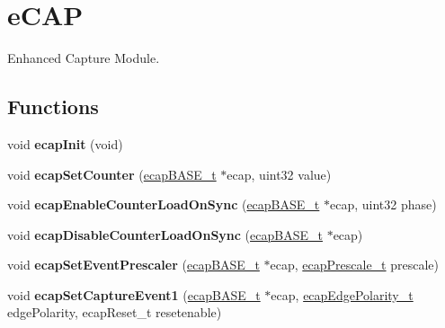 \hypertarget{group__eCAP}{}\section{e\+C\+AP}
\label{group__eCAP}


Enhanced Capture Module.  


\subsection*{Functions}
\begin{DoxyCompactItemize}
\item 
\mbox{\label{group__eCAP_ga516005c5605f393277666c3b9ba0c166}} 
void {\bfseries ecap\+Init} (void)
\item 
\mbox{\label{group__eCAP_ga364a27d4fcd363aa41d9c01cfa600138}} 
void {\bfseries ecap\+Set\+Counter} (\mbox{\hyperlink{reg__ecap_8h_a8ca3ed15315b354b71b837ed4b6685a9}{ecap\+B\+A\+S\+E\+\_\+t}} $\ast$ecap, uint32 value)
\item 
\mbox{\label{group__eCAP_ga7f98ac834b9764febaf55917242a9b90}} 
void {\bfseries ecap\+Enable\+Counter\+Load\+On\+Sync} (\mbox{\hyperlink{reg__ecap_8h_a8ca3ed15315b354b71b837ed4b6685a9}{ecap\+B\+A\+S\+E\+\_\+t}} $\ast$ecap, uint32 phase)
\item 
\mbox{\label{group__eCAP_gafd9700631fd5cb7c77abfd52f3f855d3}} 
void {\bfseries ecap\+Disable\+Counter\+Load\+On\+Sync} (\mbox{\hyperlink{reg__ecap_8h_a8ca3ed15315b354b71b837ed4b6685a9}{ecap\+B\+A\+S\+E\+\_\+t}} $\ast$ecap)
\item 
\mbox{\label{group__eCAP_ga04216d448e7d7346cdc3f15778432683}} 
void {\bfseries ecap\+Set\+Event\+Prescaler} (\mbox{\hyperlink{reg__ecap_8h_a8ca3ed15315b354b71b837ed4b6685a9}{ecap\+B\+A\+S\+E\+\_\+t}} $\ast$ecap, \mbox{\hyperlink{ecap_8h_a3d46c644d8a5a5996eda0247543f7d31}{ecap\+Prescale\+\_\+t}} prescale)
\item 
\mbox{\label{group__eCAP_gae2aaf7294e811a4037a2afb336beff3f}} 
void {\bfseries ecap\+Set\+Capture\+Event1} (\mbox{\hyperlink{reg__ecap_8h_a8ca3ed15315b354b71b837ed4b6685a9}{ecap\+B\+A\+S\+E\+\_\+t}} $\ast$ecap, \mbox{\hyperlink{ecap_8h_a9f14adf05b628329f7acc029eef7d151}{ecap\+Edge\+Polarity\+\_\+t}} edge\+Polarity, ecap\+Reset\+\_\+t resetenable)

\end{DoxyCompactItemize}
